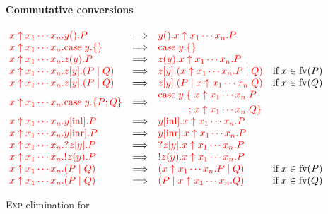 \begin{figure*}[h]
  \paragraph*{Commutative conversions}
  \(\!
  \begin{array}{lclr}
    \red{ \expn{x}{x_1 \cdots x_n}\wait{y}P }
    &\Longrightarrow&
    \red{ \wait{y}\expn{x}{x_1 \cdots x_n}P }
    \\
    \red{ \expn{x}{x_1\cdots x_n}\case{y}{}{} }
    &\Longrightarrow&
    \red{ \case{y}{}{} }
    \\
    \red{ \expn{x}{x_1 \cdots x_n}\recv{z}{y}P }
    &\Longrightarrow&
    \red{ \recv{z}{y}\expn{x}{x_1 \cdots x_n}P }
    \\
    \red{ \expn{x}{x_1 \cdots x_n}\send{z}{y}(P \mid Q) }
    &\Longrightarrow&
    \red{ \send{z}{y}(\expn{x}{x_1 \cdots x_n}P \mid Q) }
    &\text{if} \; x \in \text{fv}(P)
    \\
    \red{ \expn{x}{x_1 \cdots x_n}\send{z}{y}(P \mid Q) }
    &\Longrightarrow&
    \red{ \send{z}{y}(P \mid \expn{x}{x_1 \cdots x_n}Q) }
    &\text{if} \; x \in \text{fv}(Q) 
    \\
    \red{ \expn{x}{x_1 \cdots x_n}\case{y}{P}{Q} }
    &\Longrightarrow&
    \!\begin{aligned}
      \red{ \text{case}\;y.}
      \red{ \{\;}& \red{\expn{x}{x_1 \cdots x_n}P}\\
      \red{  ;\;}& \red{\expn{x}{x_1 \cdots x_n}Q\}}
    \end{aligned}
    \\
    \red{ \expn{x}{x_1 \cdots x_n}\inl{y}P }
    &\Longrightarrow&
    \red{ \inl{y}\expn{x}{x_1 \cdots x_n}P }
    \\
    \red{ \expn{x}{x_1 \cdots x_n}\inr{y}P }
    &\Longrightarrow&
    \red{ \inr{y}\expn{x}{x_1 \cdots x_n}P }
    \\
    \red{ \expn{x}{x_1 \cdots x_n}\give{\send{z}{y}}P }
    &\Longrightarrow&
    \red{ \give{\send{z}{y}}\expn{x}{x_1 \cdots x_n}P }
    \\
    \red{ \expn{x}{x_1 \cdots x_n}\take{\recv{z}{y}}P }
    &\Longrightarrow&
    \red{ \take{\recv{z}{y}}\expn{x}{x_1 \cdots x_n}P }
    \\
    \red{ \expn{x}{x_1 \cdots x_n}(P \mid Q) }
    &\Longrightarrow&
    \red{ (\expn{x}{x_1 \cdots x_n}P \mid Q) }
    &\text{if} \; x \in \text{fv}(P) 
    \\
    \red{ \expn{x}{x_1 \cdots x_n}(P \mid Q) }
    &\Longrightarrow&
    \red{ (P \mid \expn{x}{x_1 \cdots x_n}Q) }
    &\text{if} \; x \in \text{fv}(Q) 
  \end{array}
  \)
  \caption{\textsc{Exp} elimination for \nodcap}
  \label{fig:nodcap-expn}
\end{figure*}

